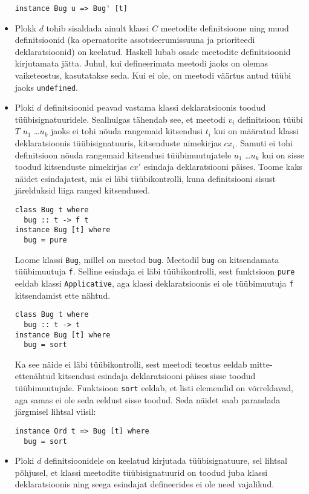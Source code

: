 \documentclass[12pt]{article}
\begin{document}
\begin{itemize}
            \begin{verbatim}instance Bug u => Bug' [t]\end{verbatim}
          \item
            Plokk $d$ tohib sisaldada ainult klassi $C$ meetodite definitsioone ning muud definitsioonid (ka operaatorite assotsieerumissuuna ja prioriteedi deklaratsioonid) on keelatud. Haskell lubab osade meetodite definitsioonid kirjutamata jätta. Juhul, kui defineerimata meetodi jaoks on olemas vaiketeostus, kasutatakse seda. Kui ei ole, on meetodi väärtus antud tüübi jaoks \verb!undefined!. 
          \item
            Ploki $d$ definitsioonid peavad vastama klassi deklaratsioonis toodud tüübisignatuuridele. Sealhulgas tähendab see, et meetodi $v_i$ definitsioon tüübi $T$ $u_1$ \ldots $u_k$ jaoks ei tohi nõuda rangemaid kitsendusi $t_i$ kui on määratud klassi deklaratsioonis tüübisignatuuris, kitsenduste nimekirjas $cx_i$. Samuti ei tohi definitsioon nõuda rangemaid kitsendusi tüübimuutujatele $u_1$ \ldots $u_k$ kui on sisse toodud kitsenduste nimekirjas $cx'$ esindaja deklaratsiooni päises. Toome kaks näidet esindajatest, mis ei läbi tüübikontrolli, kuna definitsiooni sisust järelduksid liiga ranged kitsendused.

            \begin{verbatim}class Bug t where
  bug :: t -> f t
instance Bug [t] where
  bug = pure\end{verbatim}

            Loome klassi \verb!Bug!, millel on meetod \verb!bug!. Meetodil \verb!bug! on kitsendamata tüübimuutuja \verb!f!. Selline esindaja ei läbi tüübikontrolli, sest funktsioon \verb!pure! eeldab klassi \verb!Applicative!, aga klassi deklaratsioonis ei ole tüübimuutuja \verb!f! kitsendamist ette nähtud.

            \begin{verbatim}class Bug t where
  bug :: t -> t
instance Bug [t] where
  bug = sort\end{verbatim}

            Ka see näide ei läbi tüübikontrolli, sest meetodi teostus eeldab mitte-ettenähtud kitsendusi esindaja deklaratsiooni päises sisse toodud tüübimuutujale. Funktsioon \verb!sort! eeldab, et listi elemendid on võrreldavad, aga samas ei ole seda eeldust sisse toodud. Seda näidet saab parandada järgmisel lihtsal viisil:

            \begin{verbatim}instance Ord t => Bug [t] where
  bug = sort\end{verbatim}
          \item
            Ploki $d$ definitsioonidele on keelatud kirjutada tüübisignatuure, sel lihtsal põhjusel, et klassi meetodite tüübisignatuurid on toodud juba klassi deklaratsioonis ning seega esindajat defineerides ei ole need vajalikud.
        \end{itemize}
\end{document}
